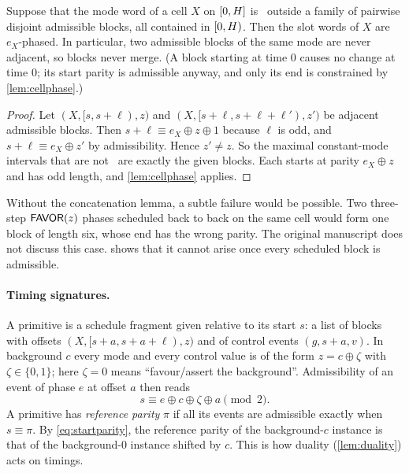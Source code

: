 \begin{lemma}[Concatenation]\label{lem:concat}
Suppose that the mode word of a cell $X$ on $[0,H]$ is \HOLD\ outside a family of pairwise
disjoint admissible blocks, all contained in $[0,H)$. Then the slot words of $X$ are
$e_X$-phased. In particular, two admissible blocks of the same mode are never adjacent, so blocks
never merge. (A block starting at time $0$ causes no change at time $0$; its start parity is
admissible anyway, and only its end is constrained by \cref{lem:cellphase}.)
\end{lemma}

\begin{proof}
Let $(X,[s,s+\ell),z)$ and $(X,[s+\ell,s+\ell+\ell'),z')$ be adjacent admissible blocks. Then
$s+\ell\equiv e_X\oplus z\oplus 1$ because $\ell$ is odd, and $s+\ell\equiv e_X\oplus z'$ by
admissibility. Hence $z'\ne z$. So the maximal constant-mode intervals that are not \HOLD\ are
exactly the given blocks. Each starts at parity $e_X\oplus z$ and has odd length, and
\cref{lem:cellphase} applies.
\end{proof}

\begin{remark}\label{rem:merging}
Without the concatenation lemma, a subtle failure would be possible. Two three-step $\textsf{FAVOR}(z)$ phases
scheduled back to back on the same cell would form one block of length six, whose end has the wrong
parity. The original manuscript does not discuss this case.  shows that it cannot
arise once every scheduled block is admissible.
\end{remark}

\paragraph{Timing signatures.}
A primitive is a schedule fragment given relative to its start $s$: a list of blocks with offsets
$(X,[s+a,s+a+\ell),z)$ and of control events $(g,s+a,v)$. In background $c$ every mode and every
control value is of the form $z=c\oplus\zeta$ with $\zeta\in\{0,1\}$; here $\zeta=0$ means
``favour/assert the background''. Admissibility of an event of phase $e$ at offset $a$ then reads
\begin{equation}\label{eq:startparity}
s\equiv e\oplus c\oplus\zeta\oplus a\pmod 2 .
\end{equation}
A primitive has \emph{reference parity} $\pi$ if all its events are admissible exactly when
$s\equiv\pi$. By \eqref{eq:startparity}, the reference parity of the background-$c$ instance is that
of the background-$0$ instance shifted by $c$. This is how duality (\cref{lem:duality}) acts on
timings.

